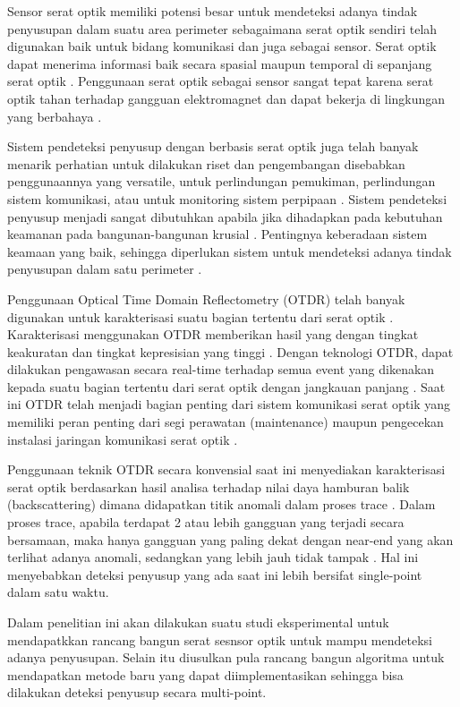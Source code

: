 \documentclass[12pt]{article}
\begin{document}
	Sensor serat optik memiliki potensi besar untuk mendeteksi adanya tindak penyusupan dalam suatu area perimeter sebagaimana serat optik sendiri telah digunakan baik untuk bidang komunikasi dan juga sebagai sensor.
	Serat optik dapat menerima informasi baik secara spasial maupun temporal di sepanjang serat optik \cite{Rao2008}.
	Penggunaan serat optik sebagai sensor sangat tepat karena serat optik tahan terhadap gangguan elektromagnet dan dapat bekerja di lingkungan yang berbahaya \cite{Bremer2016}.
	
	Sistem pendeteksi penyusup dengan berbasis serat optik juga telah banyak menarik perhatian untuk dilakukan riset dan pengembangan disebabkan penggunaannya yang versatile, untuk perlindungan pemukiman, perlindungan sistem komunikasi, atau untuk monitoring sistem perpipaan \cite{Lai2017}.
	Sistem pendeteksi penyusup menjadi sangat dibutuhkan apabila jika dihadapkan pada kebutuhan keamanan pada bangunan-bangunan krusial \cite{Quwaider2017}.
	Pentingnya keberadaan sistem keamaan yang baik, sehingga diperlukan sistem untuk mendeteksi adanya tindak penyusupan dalam satu perimeter \cite{Huang2017}.
	
	Penggunaan Optical Time Domain Reflectometry (OTDR) telah banyak digunakan untuk karakterisasi suatu bagian tertentu dari serat optik \cite{Dong2015}.
	Karakterisasi menggunakan OTDR memberikan hasil yang dengan tingkat keakuratan dan tingkat kepresisian yang tinggi \cite{He2016}.
	Dengan teknologi OTDR, dapat dilakukan pengawasan secara real-time terhadap semua event yang dikenakan kepada suatu bagian tertentu dari serat optik dengan jangkauan panjang \cite{Optical2007}.
	Saat ini OTDR telah menjadi bagian penting dari sistem komunikasi serat optik yang memiliki peran penting dari segi perawatan (maintenance) maupun pengecekan instalasi jaringan komunikasi serat optik \cite{Nettest2000}.
	
	Penggunaan teknik OTDR secara konvensial saat ini menyediakan karakterisasi serat optik berdasarkan hasil analisa terhadap nilai daya hamburan balik (backscattering) dimana didapatkan titik anomali dalam proses trace \cite{Dong2015}.
	Dalam proses trace, apabila terdapat 2 atau lebih gangguan yang terjadi secara bersamaan, maka hanya gangguan yang paling dekat dengan near-end  yang akan terlihat adanya anomali, sedangkan yang lebih jauh tidak tampak \cite{Bao2012}.
	Hal ini menyebabkan deteksi penyusup yang ada saat ini lebih bersifat single-point dalam satu waktu. 
	
	Dalam penelitian ini akan dilakukan suatu studi eksperimental untuk mendapatkkan rancang bangun serat sesnsor optik untuk mampu mendeteksi adanya penyusupan.
	Selain itu diusulkan pula rancang bangun algoritma untuk mendapatkan metode baru yang dapat diimplementasikan sehingga bisa dilakukan deteksi penyusup secara multi-point.
	
\end{document}
